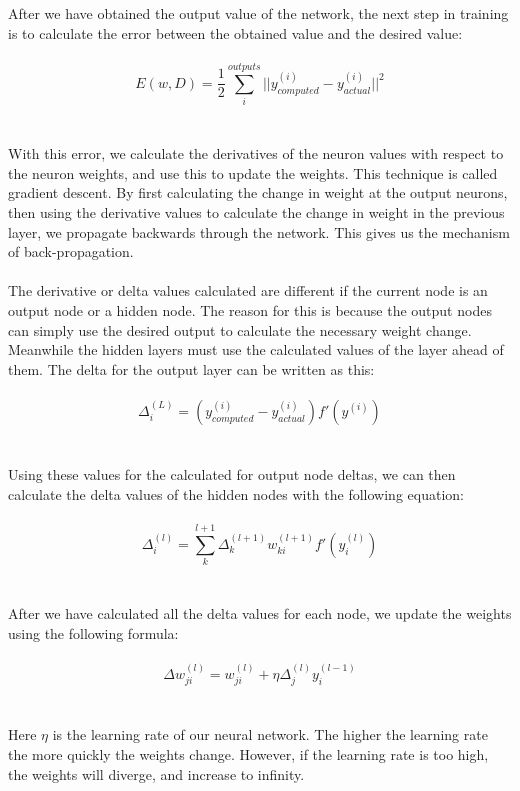 \documentclass[12pt,twoside]{article} %
\begin{document}
\\\\
After we have obtained the output value of the network, the next step in training is to calculate the error between the obtained value and the desired value:
\\\\
$$E(w, D) = \frac{1}{2}\sum_i^{outputs}||y_{computed}^{(i)} - y_{actual}^{(i)}||^2$$
\\\\
With this error, we calculate the derivatives of the neuron values with respect to the neuron weights, and use this to update the weights. This technique is called gradient descent. By first calculating the change in weight at the output neurons, then using the derivative values to calculate the change in weight in the previous layer, we propagate backwards through the network. This gives us the mechanism of back-propagation.
\\\\
The derivative or delta values calculated are different if the current node is an output node or a hidden node. The reason for this is because the output nodes can simply use the desired output to calculate the necessary weight change. Meanwhile the hidden layers must use the calculated values of the layer ahead of them. The delta for the output layer can be written as this:
\\\\
$$\Delta_i^{(L)} = (y_{computed}^{(i)} - y_{actual}^{(i)})f'(y^{(i)})$$
\\\\
Using these values for the calculated for output node deltas, we can then calculate the delta values of the hidden nodes with the following equation:
\\\\
$$\Delta_i^{(l)} =  \sum^{l+1}_k \Delta_k^{(l+1)}w_{ki}^{(l+1)}f'(y_i^{(l)})$$
\\\\
After we have calculated all the delta values for each node, we update the weights using the following formula:
\\\\
$$\Delta w_{ji}^{(l)} = w_{ji}^{(l)} + \eta\Delta_j^{(l)}y_i^{(l-1)}$$
\\\\
Here $\eta$ is the learning rate of our neural network. The higher the learning rate the more quickly the weights change. However, if the learning rate is too high, the weights will diverge, and increase to infinity. 
\end{document}
